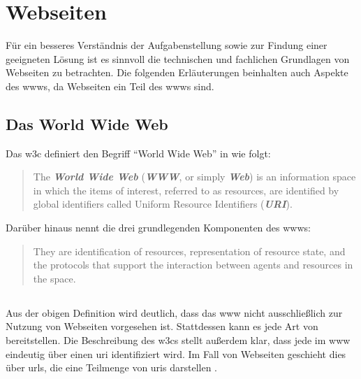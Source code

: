\section{Webseiten}
    \label{section:problemAnalysisWebpagesInTheWWW}
    Für ein besseres Verständnis der Aufgabenstellung sowie zur Findung
    einer geeigneten Lösung ist es sinnvoll die technischen und fachlichen
    Grundlagen von Webseiten zu betrachten.
    Die folgenden Erläuterungen beinhalten auch Aspekte des \glspl{www},
    da Webseiten ein Teil des \glspl{www} sind.

    \subsection{Das World Wide Web}
        Das \gls{w3c} definiert den Begriff "`World Wide Web"' in \cite{w3c:wwwArch} wie folgt:

        \begin{quote}
            The \textit{\textbf{World Wide Web}} (\textit{\textbf{WWW}}, or simply \textit{\textbf{Web}})
            is an information space in which the items of interest, referred to as resources,
            are identified by global identifiers called Uniform Resource Identifiers (\textit{\textbf{URI}}).
        \end{quote}

        Darüber hinaus nennt \cite{w3c:wwwArch} die drei grundlegenden Komponenten des \glspl{www}:

        \begin{quote}
            They are identification of resources,
            representation of resource state, and the protocols
            that support the interaction between agents and resources in the space.
        \end{quote}

    \subsection{{\resources}}
        \label{section:problemAnalysisWebpagesInTheWWWResources}
        Aus der obigen Definition wird deutlich,
        dass das \gls{www} nicht ausschließlich zur Nutzung von Webseiten
        vorgesehen ist.
        Stattdessen kann es jede Art von {\resources} bereitstellen.
        Die Beschreibung des \glspl{w3c} stellt außerdem klar,
        dass jede {\resource} im \gls{www} eindeutig über einen \gls{uri} identifiziert wird.
        Im Fall von Webseiten geschieht dies über \glspl{url},
        die eine Teilmenge von \glspl{uri} darstellen
        \cite[Kapitel 1.1.3]{rfc:3986}.


